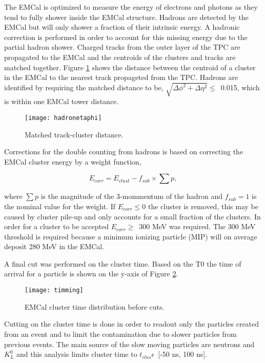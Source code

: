 The EMCal is optimized to measure the energy of electrons and photons as they tend to fully shower inside the EMCal structure.  Hadrons are detected by the EMCal but will only shower a fraction of their intrinsic energy.  A hadronic correction is performed in order to account for this missing energy due to the partial hadron shower.  Charged tracks from the outer layer of the TPC are propagated to the EMCal and the centroids of the clusters and tracks are matched together.  Figure \ref{fig:EMChadetaphi} shows the distance between the centroid of a cluster in the EMCal to the nearest track propageted from the TPC.  Hadrons are identified by requiring the matched distance to be, $\sqrt{ \Delta\phi^{2} + \Delta\eta^{2} } \leq \,$ 0.015, which is within one EMCal tower distance.

\begin{figure}[h]
\texttt{[image: hadronetaphi]}
\centering
\caption{Matched track-cluster distance.}
\label{fig:EMChadetaphi}
\end{figure}

\noindent
Corrections for the double counting from hadrons is based on correcting the EMCal cluster energy by a weight function,

\begin{equation}
E_{corr} = E_{clust} - f_{sub} \times \sum p ,
\label{eq:HadCorr}
\end{equation}

\noindent
where $\sum p$ is the magnitude of the 3-mommentum of the hadron and $f_{sub} = 1$ is the nominal value for the weight.  If $E_{corr} \leq 0$ the cluster is removed, this may be caused by cluster pile-up and only accounts for a small fraction of the clusters.  In order for a cluster to be accepted $E_{corr} \geq \,$ 300 MeV was required.  The 300 MeV threshold is required because a minimum ionizing particle (MIP) will on average deposit 280 MeV in the EMCal.  

A final cut was performed on the cluster time.  Based on the T0 the time of arrival for a particle is shown on the y-axis of Figure \ref{fig:EMCaltime}.  

\begin{figure}[!h]
\texttt{[image: timming]}
\centering
\caption{EMCal cluster time distribution before cuts.}
\label{fig:EMCaltime}
\end{figure}

\noindent
Cutting on the cluster time is done in order to readout only the particles created from an event and to limit the contamination due to slower particles from previous events.  The main source of the slow moving particles are neutrons and $K_{L}^{0}$ and this analysis limits cluster time to $t_{clus} \epsilon \,$ [-50 ns, 100 ns].


